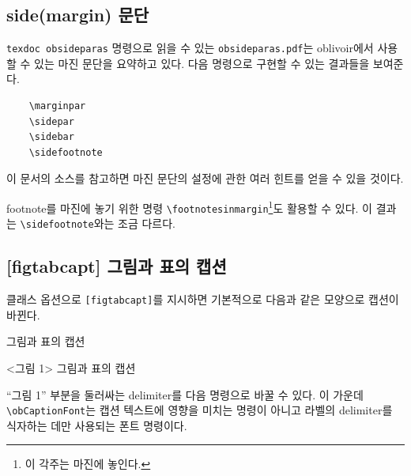 \documentclass[
	12pt,
	a4paper,
	kosection,
	footnote,
	nobookmarks,
	microtype,
	figtabcapt,
]{oblivoir}
\begin{document}

%
%

\subsection{side(margin) 문단}

\verb|texdoc obsideparas| 명령으로 읽을 수 있는 \texttt{obsideparas.pdf}는 \textsf{oblivoir}에서
사용할 수 있는 마진 문단을 요약하고 있다. 다음 명령으로 구현할 수 있는 결과들을 보여준다.

\begin{verbatim}
    \marginpar
    \sidepar
    \sidebar
    \sidefootnote
\end{verbatim}

이 문서의 소스를 참고하면 마진 문단의 설정에 관한 여러 힌트를 얻을 수 있을 것이다.

\footnotesinmargin
footnote를 마진에 놓기 위한 명령 \verb|\footnotesinmargin|\footnote
{이 각주는 마진에 놓인다.}도 활용할 수 있다. 이 결과는 \verb|\sidefootnote|와는
조금 다르다.
\footnotesatfoot

\subsection{[figtabcapt] 그림과 표의 캡션}

클래스 옵션으로 \texttt{[figtabcapt]}를 지시하면 기본적으로 다음과 같은 모양으로 캡션이 바뀐다.

\begin{boxedverbatim}
\caption{그림과 표의 캡션}
\end{boxedverbatim}
\begin{minipage}{\linewidth}
\centering
<그림 1> \quad 그림과 표의 캡션
\end{minipage}

\medskip

``그림 1'' 부분을 둘러싸는 delimiter를 다음 명령으로 바꿀 수 있다. 이 가운데
\verb|\obCaptionFont|는 캡션 텍스트에 영향을 미치는 명령이 아니고 라벨의 delimiter를
식자하는 데만 사용되는 폰트 명령이다.
\begin{boxedverbatim}
\renewcommand*\obCaptionnameOpen{[}
\renewcommand*\obCaptionnameClose{]}
\obCaptionFont{\sffamily\bfseries}
\end{boxedverbatim}
\renewcommand*\obCaptionnameOpen{[}
\renewcommand*\obCaptionnameClose{]}
\obCaptionFont{\sffamily}
\end{document}
